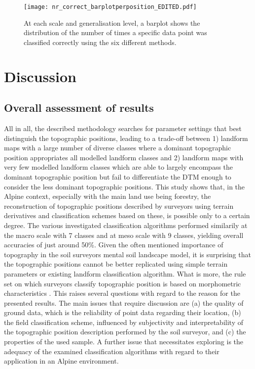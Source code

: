 \documentclass[final,1p,times,twocolumn,authoryear]{elsarticle}
\begin{document}
\begin{figure}
\texttt{[image: nr\_correct\_barplotperposition\_EDITED.pdf]}
\caption{At each scale and generalisation level, a barplot shows the distribution of the number of times a specific data point was classified correctly using the six different methods.}
\label{fig:hist_correct_per_tp}
\end{figure}


\section{Discussion}
\subsection{Overall assessment of results}
All in all, the described methodology searches for parameter settings that best distinguish the topographic positions, leading to a trade-off between 1) landform maps with a large number of diverse classes where a dominant topographic position appropriates all modelled landform classes and 2) landform maps with very few modelled landform classes which are able to largely encompass the dominant topographic position but fail to differentiate the DTM enough to consider the less dominant topographic positions.
This study shows that, in the Alpine context, especially with the main land use being forestry, the reconstruction of topographic positions described by surveyors using terrain derivatives and classification schemes based on these, is possible only to a certain degree. The various investigated classification algorithms performed similarily at the  macro scale with 7 classes and at meso scale with 9 classes, yielding overall accuracies of just around 50\%. Given the often mentioned importance of topography in the soil surveyors mental soil landscape model, it is surprising that the topographic positions cannot be better replicated using simple terrain parameters or existing landform classification algorithm. What is more, the rule set on which surveyors classify topographic position is based on morphometric characteristics \citep{Englisch1998}. This raises several questions with regard to the reason for the presented results. The main issues that require discussion are (a) the quality of ground data, which is the reliability of point data regarding their location, (b) the field classification scheme, influenced by subjectivity and interpretability of the topographic position description performed by the soil surveyor, and (c) the properties of the used sample. A further issue that necessitates exploring is the adequacy of the examined classification algorithms with regard to their application in an Alpine environment. 
\end{document}

